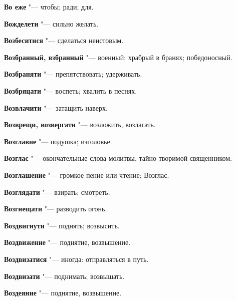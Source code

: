\begin{mymulticols}{2}
\noindent\textbf{Во еже} "--- чтобы; ради; для. 




\noindent\textbf{Вожделети} "--- сильно желать. 




\noindent\textbf{Возбеситися} "--- сделаться неистовым. 




\noindent\textbf{Возбранный, взбранный} "--- военный; храбрый в бранях; победоносный. 




\noindent\textbf{Возбраняти} "--- препятствовать; удерживать. 




\noindent\textbf{Возбряцати} "--- воспеть; хвалить в песнях. 




\noindent\textbf{Возвлачити} "--- затащить наверх. 




\noindent\textbf{Возврещи, возвергати} "--- возложить, возлагать. 




\noindent\textbf{Возглавие} "--- подушка; изголовье. 




\noindent\textbf{Возглас} "--- окончательные слова молитвы, тайно творимой священником. 




\noindent\textbf{Возглашение} "--- громкое пение или чтение; Возглас. 




\noindent\textbf{Возглядати} "--- взирать; смотреть. 




\noindent\textbf{Возгнещати} "--- разводить огонь. 




\noindent\textbf{Воздвигнути} "--- поднять; возвысить. 




\noindent\textbf{Воздвижение} "--- поднятие, возвышение. 




\noindent\textbf{Воздвизатися} "--- иногда: отправляться в путь. 




\noindent\textbf{Воздвизати} "--- поднимать; возвышать. 




\noindent\textbf{Воздеяние} "--- поднятие, возвышение. 





\end{mymulticols}
